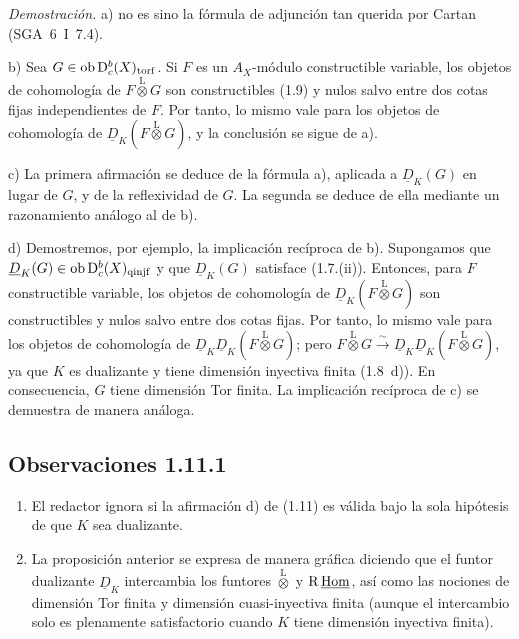 \emph{Demostración.} a) no es sino la fórmula de adjunción tan querida por Cartan (SGA~6~I~7.4).

b) Sea $G \in \operatorname{ob} \mathrm{D}_c^{b}(X)_{\mathrm{torf}}$. Si $F$ es un $A_X$-módulo constructible variable, los objetos de cohomología de $F \mathop{\otimes}\limits^{\mathrm{L}} G$ son constructibles (1.9) y nulos salvo entre dos cotas fijas independientes de $F$. Por tanto, lo mismo vale para los objetos de cohomología de $\underline{D}_K(F \mathop{\otimes}\limits^{\mathrm{L}} G)$, y la conclusión se sigue de a).

c) La primera afirmación se deduce de la fórmula a), aplicada a $\underline{D}_K(G)$ en lugar de $G$, y de la reflexividad de $G$. La segunda se deduce de ella mediante un razonamiento análogo al de b).

d) Demostremos, por ejemplo, la implicación recíproca de b). Supongamos que $\underline{D}_K(G) \in \operatorname{ob} \mathrm{D}_c^{b}(X)_{\mathrm{qinjf}}$ y que $\underline{D}_K(G)$ satisface (1.7.(ii)). Entonces, para $F$ constructible variable, los objetos de cohomología de $\underline{D}_K(F \mathop{\otimes}\limits^{\mathrm{L}} G)$ son constructibles y nulos salvo entre dos cotas fijas. Por tanto, lo mismo vale para los objetos de cohomología de $\underline{D}_K \underline{D}_K(F \mathop{\otimes}\limits^{\mathrm{L}} G)$; pero $F \mathop{\otimes}\limits^{\mathrm{L}} G \xrightarrow{\sim} \underline{D}_K \underline{D}_K(F \mathop{\otimes}\limits^{\mathrm{L}} G)$, ya que $K$ es dualizante y tiene dimensión inyectiva finita (1.8~d)). En consecuencia, $G$ tiene dimensión Tor finita. La implicación recíproca de c) se demuestra de manera análoga.

\subsection*{Observaciones 1.11.1}
\begin{enumerate}
\item[a)] El redactor ignora si la afirmación d) de (1.11) es válida bajo la sola hipótesis de que $K$ sea dualizante.
\item[b)] La proposición anterior se expresa de manera gráfica diciendo que el funtor dualizante $\underline{D}_K$ intercambia los funtores $\mathop{\otimes}\limits^{\mathrm{L}}$ y $\mathrm{R}\,\underline{\operatorname{Hom}}$, así como las nociones de dimensión Tor finita y dimensión cuasi-inyectiva finita (aunque el intercambio solo es plenamente satisfactorio cuando $K$ tiene dimensión inyectiva finita).
\end{enumerate}
